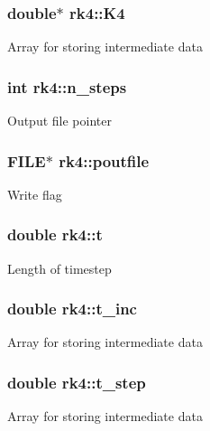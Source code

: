 \subsubsection[{K4}]{\setlength{\rightskip}{0pt plus 5cm}double$\ast$ rk4\+::\+K4}\label{structrk4_af94017f53b4c629e055a14f8c48572dd}
Array for storing intermediate data \hypertarget{structrk4_afdb98234387428a832f96e7ccc2ec470}{}
\subsubsection[{n\+\_\+steps}]{\setlength{\rightskip}{0pt plus 5cm}int rk4\+::n\+\_\+steps}\label{structrk4_afdb98234387428a832f96e7ccc2ec470}
Output file pointer \hypertarget{structrk4_ad2b4a48f52e1ea5206a306827ba717b7}{}
\subsubsection[{poutfile}]{\setlength{\rightskip}{0pt plus 5cm}F\+I\+L\+E$\ast$ rk4\+::poutfile}\label{structrk4_ad2b4a48f52e1ea5206a306827ba717b7}
Write flag \hypertarget{structrk4_ab1179e509c8df420d8d9f89af1a842d3}{}
\subsubsection[{t}]{\setlength{\rightskip}{0pt plus 5cm}double rk4\+::t}\label{structrk4_ab1179e509c8df420d8d9f89af1a842d3}
Length of timestep \hypertarget{structrk4_ab4c880c62f39a795976c2b0746accfa0}{}
\subsubsection[{t\+\_\+inc}]{\setlength{\rightskip}{0pt plus 5cm}double rk4\+::t\+\_\+inc}\label{structrk4_ab4c880c62f39a795976c2b0746accfa0}
Array for storing intermediate data \hypertarget{structrk4_a1cd740ec71a9b29db5f7e66977e3f141}{}
\subsubsection[{t\+\_\+step}]{\setlength{\rightskip}{0pt plus 5cm}double rk4\+::t\+\_\+step}\label{structrk4_a1cd740ec71a9b29db5f7e66977e3f141}
Array for storing intermediate data \hypertarget{structrk4_af11a7c143fbea8168fb9d5d5c259e05e}{}
